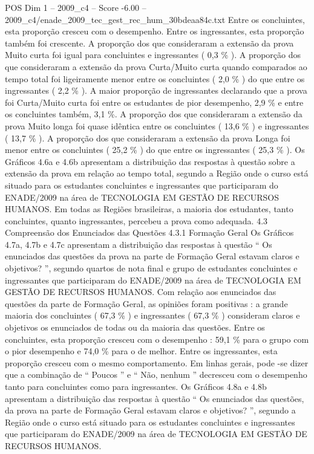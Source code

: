 \begin{textsample}{POS Dim 1 – 2009\_c4 – Score -6.00 – 2009\_c4/enade\_2009\_tec\_gest\_rec\_hum\_30bdeaa84c.txt}
Entre os concluintes, esta proporção cresceu com o desempenho.
Entre os ingressantes, esta proporção também foi crescente.
A proporção dos que consideraram a extensão da prova Muito curta foi igual para concluintes e ingressantes ( 0,3 \% ).
A proporção dos que consideraram a extensão da prova Curta/Muito curta quando comparados ao tempo total foi ligeiramente menor entre os concluintes ( 2,0 \% ) do que entre os ingressantes ( 2,2 \% ).
A maior proporção de ingressantes declarando que a prova foi Curta/Muito curta foi entre os estudantes de pior desempenho, 2,9 \% e entre os concluintes também, 3,1 \%.
A proporção dos que consideraram a extensão da prova Muito longa foi quase idêntica entre os concluintes ( 13,6 \% ) e ingressantes ( 13,7 \% ).
A proporção dos que consideraram a extensão da prova Longa foi menor entre os concluintes ( 25,2 \% ) do que entre os ingressantes ( 25,3 \% ).
Os Gráficos 4.6a e 4.6b apresentam a distribuição das respostas à questão sobre a extensão da prova em relação ao tempo total, segundo a Região onde o curso está situado para os estudantes concluintes e ingressantes que participaram do ENADE/2009 na área de TECNOLOGIA EM GESTÃO DE RECURSOS HUMANOS.
Em todas as Regiões brasileiras, a maioria dos estudantes, tanto concluintes, quanto ingressantes, percebeu a prova como adequada. 4.3 Compreensão dos Enunciados das Questões 4.3.1 Formação Geral Os Gráficos 4.7a, 4.7b e 4.7c apresentam a distribuição das respostas à questão “ Os enunciados das questões da prova na parte de Formação Geral estavam claros e objetivos? ”, segundo quartos de nota final e grupo de estudantes concluintes e ingressantes que participaram do ENADE/2009 na área de TECNOLOGIA EM GESTÃO DE RECURSOS HUMANOS.
Com relação aos enunciados das questões da parte de Formação Geral, as opiniões foram positivas : a grande maioria dos concluintes ( 67,3 \% ) e ingressantes ( 67,3 \% ) consideram claros e objetivos os enunciados de todas ou da maioria das questões.
Entre os concluintes, esta proporção cresceu com o desempenho : 59,1 \% para o grupo com o pior desempenho e 74,0 \% para o de melhor.
Entre os ingressantes, esta proporção cresceu com o mesmo comportamento.
Em linhas gerais, pode -se dizer que a combinação de “ Poucos ” e “ Não, nenhum ” decresceu com o desempenho tanto para concluintes como para ingressantes.
Os Gráficos 4.8a e 4.8b apresentam a distribuição das respostas à questão “ Os enunciados das questões, da prova na parte de Formação Geral estavam claros e objetivos? ”, segundo a Região onde o curso está situado para os estudantes concluintes e ingressantes que participaram do ENADE/2009 na área de TECNOLOGIA EM GESTÃO DE RECURSOS HUMANOS.

\end{textsample}

